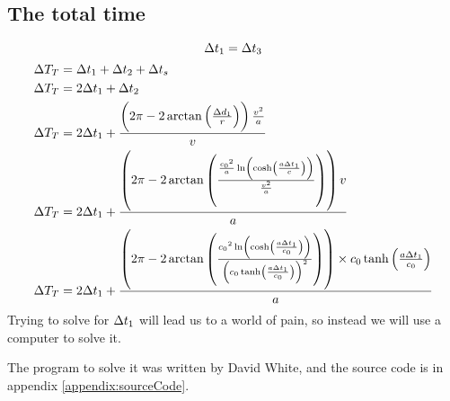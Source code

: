 	\subsection{The total time}
		\[\mathrm{\Delta} t_1 = \mathrm{\Delta} t_3\]
		\begin{align*}
			\Del T_T &= \Del t_1 + \Del t_2 + \Del t_s\\
			\Del T_T &= 2\Del t_1 + \Del t_2\\
			\Del T_T &= 2\Del t_1 + \frac{\left(2\pi - 2\arctan\left(\frac{\Del d_1}{r}\right)\right) \frac{v^2}{a}}{v}\\
			\Del T_T &= 2\Del t_1+\frac{\left(2\pi - 2\arctan\left(\frac{\frac{\si{\clight}^2}{a}\ln\left(\cosh\left(\frac{a\Del t_1}{c}\right)\right)}{\frac{v^2}{a}}\right)\right) v}{a}\\
			\Del T_T &= 2\Del t_1+\frac{\left(2\pi-2\arctan\left(\frac{\si{\clight}^2\ln\left(\cosh\left(\frac{a\Del t_1}{\si{\clight}}\right)\right)}{\left(\si{\clight}\tanh\left(\frac{a\Del t_1}{\si{\clight}}\right)\right)^2}\right)\right) \times \si{\clight}\tanh\left(\frac{a\Del t_1}{\si{\clight}}\right)}{a}
		\end{align*}
		Trying to solve for $\mathrm{\Delta} t_1$ will lead us to a world of pain, so instead we will use a computer to solve it.

		The program to solve it was written by David White, and the source code is in appendix \vref{appendix:sourceCode}.
